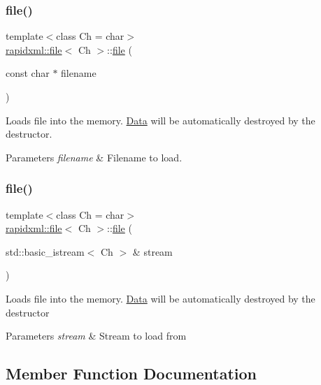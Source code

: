 \subsubsection{\texorpdfstring{file()}{file()}\hspace{0.1cm}{\footnotesize\ttfamily [1/2]}}
{\footnotesize\ttfamily template$<$class Ch  = char$>$ \\
\hyperlink{classrapidxml_1_1file}{rapidxml\+::file}$<$ Ch $>$\+::\hyperlink{classrapidxml_1_1file}{file} (\begin{DoxyParamCaption}\item[{const char $\ast$}]{filename }\end{DoxyParamCaption})\hspace{0.3cm}{\ttfamily [inline]}}

Loads file into the memory. \hyperlink{classData}{Data} will be automatically destroyed by the destructor. 
\begin{DoxyParams}{Parameters}
{\em filename} & Filename to load. \\
\hline
\end{DoxyParams}
\mbox{\label{classrapidxml_1_1file_a90707ccd991cc392dcf4bef37eed9d1f}} 
\subsubsection{\texorpdfstring{file()}{file()}\hspace{0.1cm}{\footnotesize\ttfamily [2/2]}}
{\footnotesize\ttfamily template$<$class Ch  = char$>$ \\
\hyperlink{classrapidxml_1_1file}{rapidxml\+::file}$<$ Ch $>$\+::\hyperlink{classrapidxml_1_1file}{file} (\begin{DoxyParamCaption}\item[{std\+::basic\+\_\+istream$<$ Ch $>$ \&}]{stream }\end{DoxyParamCaption})\hspace{0.3cm}{\ttfamily [inline]}}

Loads file into the memory. \hyperlink{classData}{Data} will be automatically destroyed by the destructor 
\begin{DoxyParams}{Parameters}
{\em stream} & Stream to load from \\
\hline
\end{DoxyParams}


\subsection{Member Function Documentation}
\mbox{\label{classrapidxml_1_1file_af1c71d65862c7af14e4708e32a80c1de}} 
